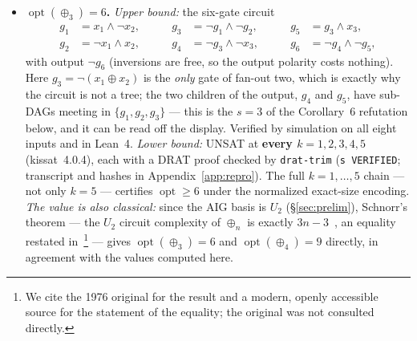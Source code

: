 \documentclass[11pt]{article}
\DeclareMathOperator{\opt}{opt}
\theoremstyle{plain}
\begin{document}
\begin{itemize}
  \item \textbf{$\opt(\oplus_3) = 6$.} \emph{Upper bound:} the six-gate circuit
  \begin{equation}\label{eq:c6}
  \begin{aligned}
    g_1 &= x_1 \wedge \neg x_2, &\qquad g_3 &= \neg g_1 \wedge \neg g_2, &\qquad g_5 &= g_3 \wedge x_3,\\
    g_2 &= \neg x_1 \wedge x_2, &\qquad g_4 &= \neg g_3 \wedge \neg x_3, &\qquad g_6 &= \neg g_4 \wedge \neg g_5,
  \end{aligned}
  \end{equation}
  with output $\neg g_6$ (inversions are free, so the output polarity costs nothing). Here
  $g_3 = \neg(x_1 \oplus x_2)$ is the \emph{only} gate of fan-out two, which is exactly why the
  circuit is not a tree; the two children of the output, $g_4$ and $g_5$, have sub-DAGs meeting in
  $\{g_1, g_2, g_3\}$ --- this is the $s = 3$ of the Corollary~6 refutation below, and it can be
  read off the display. Verified by simulation on all eight inputs and in Lean~4.
  \emph{Lower bound:}
  UNSAT at \textbf{every $k = 1,2,3,4,5$} (kissat~4.0.4), each with a DRAT proof checked by
  \texttt{drat-trim} (\texttt{s VERIFIED}; transcript and hashes in Appendix~\ref{app:repro}). The
  full $k = 1,\dots,5$ chain --- not only $k = 5$ --- certifies $\opt \ge 6$ under the normalized
  exact-size encoding. \emph{The value is also classical:} since the AIG basis is $U_2$ (\S\ref{sec:prelim}),
  Schnorr's theorem --- the $U_2$ circuit complexity of $\oplus_n$ is exactly
  $3n-3$~\cite{schnorr1974}, an equality restated in~\cite{morizumi2015}\footnote{We cite the
  1976 original for the result and a modern, openly accessible source for the statement of the
  equality; the original was not consulted directly.} --- gives $\opt(\oplus_3) = 6$ and $\opt(\oplus_4) = 9$ directly, in
  agreement with the values computed here.


\end{itemize}
\end{document}
